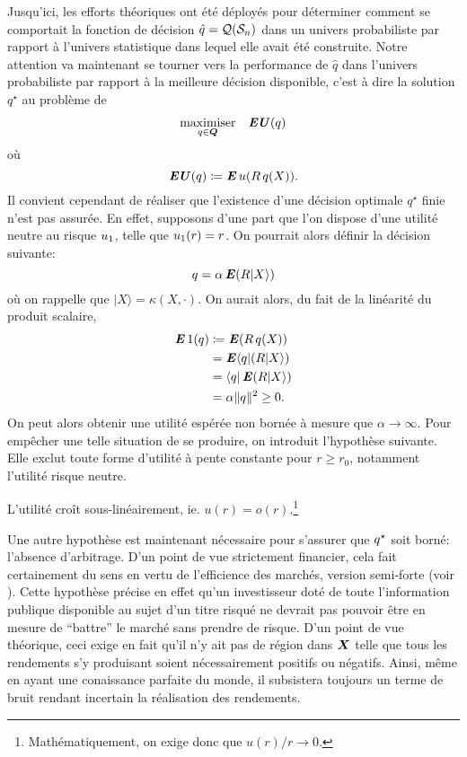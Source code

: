 Jusqu'ici, les efforts théoriques ont été déployés pour déterminer comment se comportait
la fonction de décision $\hat q = \alg(\S_n)$ dans un univers probabiliste par rapport à
l'univers statistique dans lequel elle avait été construite. Notre attention va maintenant
se tourner vers la performance de $\hat q$ dans l'univers probabiliste par rapport à la
meilleure décision disponible, c'est à dire la solution $q^\star$ au problème de 
\begin{equation}
  \maximizeEquation[q \in \Q]{\EU(q)}
\end{equation}
où
\begin{equation}
  \EU(q) \coloneq \E u(R\,q(X)).
\end{equation}
Il convient cependant de réaliser que l'existence d'une décision optimale $q^\star$ finie
n'est pas assurée. En effet, supposons d'une part que l'on dispose d'une utilité neutre au
risque $\rn$, telle que $\rn(r) = r$. On pourrait alors définir la décision suivante:
\begin{equation}
  q = \alpha\E(R|X\rangle)
\end{equation}
où on rappelle que $|X\rangle = \kappa(X,\cdot)$. On aurait alors, du fait de la linéarité du produit
scalaire,
\begin{align}
  \E1(q) & \coloneq \E(R\,q(X))\\
         & = \E\langle q|(R|X\rangle)\\
         & = \langle q|\E(R|X\rangle)\\
         & = \alpha\|q\|^2 \geq 0.
\end{align}
On peut alors obtenir une utilité espérée non bornée à mesure que $\alpha\to\infty$. Pour empêcher une
telle situation de se produire, on introduit l'hypothèse suivante. Elle exclut toute forme
d'utilité à pente constante pour $r \geq r_0$, notamment l'utilité risque neutre.
\begin{assumption}
  L'utilité croît sous-linéairement, ie. $u(r) = o(r)$.\footnote{Mathématiquement, on exige
    donc que $u(r)/r \to 0$.} 
\end{assumption}

Une autre hypothèse est maintenant nécessaire pour s'assurer que $\qs$ soit borné:
l'absence d'arbitrage. D'un point de vue strictement financier, cela fait certainement du
sens en vertu de l'efficience des marchés, version semi-forte (voir
\cite{fama1970efficient}). Cette hypothèse précise en effet qu'un investisseur doté de
toute l'information publique disponible au sujet d'un titre risqué ne devrait pas pouvoir
être en mesure de ``battre'' le marché sans prendre de risque. D'un point de vue
théorique, ceci exige en fait qu'il n'y ait pas de région dans $\X$ telle que tous les
rendements s'y produisant soient nécessairement positifs ou négatifs. Ainsi, même en ayant
une conaissance parfaite du monde, il subsistera toujours un terme de bruit rendant
incertain la réalisation des rendements.

